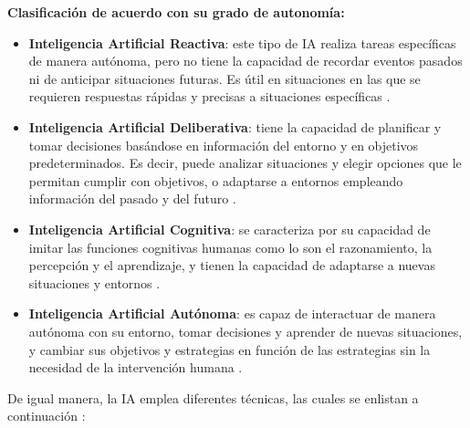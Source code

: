 \textbf{Clasificación de acuerdo con su grado de autonomía:}

\begin{itemize}
    \item \textbf{Inteligencia Artificial Reactiva}: este tipo de IA realiza tareas específicas de manera autónoma, pero no tiene la capacidad de recordar eventos pasados ni de anticipar situaciones futuras. Es útil en situaciones en las que se requieren respuestas rápidas y precisas a situaciones específicas \cite{ref42}.\\
    \item \textbf{Inteligencia Artificial Deliberativa}: tiene la capacidad de planificar y tomar decisiones basándose en información del entorno y en objetivos predeterminados. Es decir, puede analizar situaciones y elegir opciones que le permitan cumplir con objetivos, o adaptarse a entornos empleando información del pasado y del futuro \cite{ref42}.\\
    \item \textbf{Inteligencia Artificial Cognitiva}: se caracteriza por su capacidad de imitar las funciones cognitivas humanas como lo son el razonamiento, la percepción y el aprendizaje, y tienen la capacidad de adaptarse a nuevas situaciones y entornos \cite{ref42}.\\
    \item \textbf{Inteligencia Artificial Autónoma}: es capaz de interactuar de manera autónoma con su entorno, tomar decisiones y aprender de nuevas situaciones, y cambiar sus objetivos y estrategias en función de las estrategias sin la necesidad de la intervención humana \cite{ref42}.
\end{itemize}

De igual manera, la IA emplea diferentes técnicas, las cuales se enlistan a continuación \cite{ref43}:

